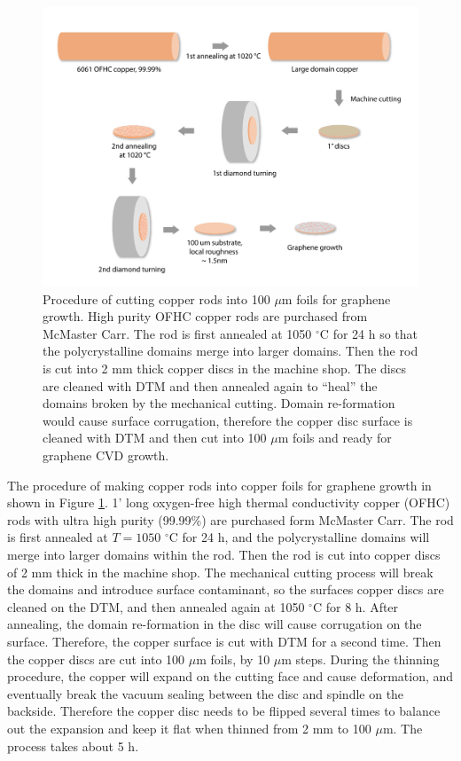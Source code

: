 \documentclass[pdflatex, sectionletters, 12pt]{pittetd}    %
\begin{document}
\begin{figure}[p]
	\centering
	\includegraphics[width=1\textwidth]{Drawing/CopperProcessing.pdf}
	\caption{Procedure of cutting copper rods into 100 $\mu$m foils for graphene growth. High purity OFHC copper rods are purchased from McMaster Carr. The rod is first annealed at 1050 $^{\circ}$C for 24 h so that the polycrystalline domains merge into larger domains. Then the rod is cut into 2 mm thick copper discs in the machine shop. The discs are cleaned with DTM and then annealed again to ``heal'' the domains broken by the mechanical cutting. Domain re-formation would cause surface corrugation, therefore the copper disc surface is cleaned with DTM and then cut into 100 $\mu$m foils and ready for graphene CVD growth. }
	\label{FIG:CopperProcessing}
\end{figure}

The procedure of making copper rods into copper foils for graphene growth in shown in Figure \ref{FIG:CopperProcessing}. 1' long oxygen-free high thermal conductivity copper (OFHC) rods with ultra high purity (99.99\%) are purchased form McMaster Carr. The rod is first annealed at $T=1050$ $^{\circ}$C for 24 h, and the polycrystalline domains will merge into larger domains within the rod. Then the rod is cut into copper discs of 2 mm thick in the machine shop. The mechanical cutting process will break the domains and introduce surface contaminant, so the surfaces copper discs are cleaned on the DTM, and then annealed again at 1050 $^{\circ}$C for 8 h. After annealing, the domain re-formation in the disc will cause corrugation on the surface. Therefore, the copper surface is cut with DTM for a second time. Then the copper discs are cut into 100 $\mu$m foils, by 10 $\mu$m steps. During the thinning procedure, the copper will expand on the cutting face and cause deformation, and eventually break the vacuum sealing between the disc and spindle on the backside. Therefore the copper disc needs to be flipped several times to balance out the expansion and keep it flat when thinned from 2 mm to 100 $\mu$m. The process takes about 5 h. 
\end{document}
